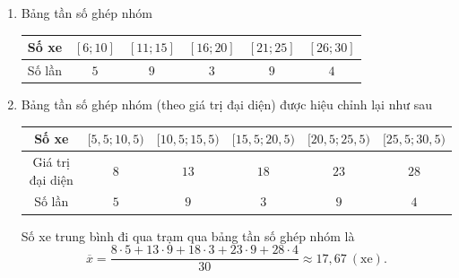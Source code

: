 \begin{bt}
{\begin{enumerate}
			\begin{eqnarray*}
				\overline{x}&=&\dfrac{6\cdot 2+7+9+10+11\cdot 4+12+13+15\cdot 3}{30}\\
				&&+\dfrac{16+17+19+21\cdot 3+23\cdot 3+24+25\cdot 2+27+28+29\cdot 2}{30}\\
				&\approx& 17{,}43\ (\text{xe}).
			\end{eqnarray*}	
			\item Bảng tần số ghép nhóm
			\begin{center}
				\begin{tabular}{|c|c|c|c|c|c|}
					\hline Số xe &{$[6; 10]$} &{$[11; 15]$} &{$[16; 20]$} &{$[21; 25]$} &{$[26; 30]$} \\
					\hline Số lần & $5$ & $9$ & $3$ & $9$ & $4$ \\
					\hline
				\end{tabular}
			\end{center}
			\item Bảng tần số ghép nhóm (theo giá trị đại diện) được hiệu chỉnh lại như sau
			\begin{center}
				\begin{tabular}{|c|c|c|c|c|c|}
					\hline Số xe &{$[5{,}5; 10{,}5)$} &{$[10{,}5; 15{,}5)$} &{$[15{,}5; 20{,}5)$} &{$[20{,}5; 25{,}5)$} &{$[25{,}5; 30{,}5)$} \\
					\hline Giá trị đại diện &{$8$} &{$13$} &{$18$} &{$23$} &{$28$} \\
					\hline Số lần & $5$ & $9$ & $3$ & $9$ & $4$ \\
					\hline
				\end{tabular}
			\end{center}
			Số xe trung bình đi qua trạm qua bảng tần số ghép nhóm là
			\[\overline{x}=\dfrac{8\cdot 5+13\cdot 9+18\cdot 3+23\cdot 9+28\cdot 4}{30}\approx 17{,}67\ (\text{xe}). \]
		\end{enumerate}
	}
\end{bt}

